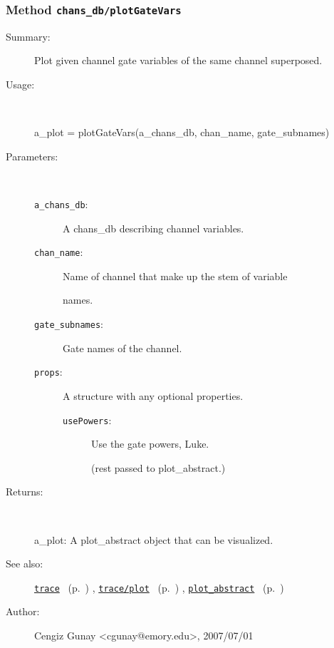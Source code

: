 \subsubsection[Method \texttt{plotGateVars}]{Method \texttt{chans\_db/plotGateVars}}%
%
\label{ref_chans_db__plotGateVars}%
\hypertarget{ref_chans_db__plotGateVars}{}%
\begin{description}
\item[Summary:]Plot given channel gate variables of the same channel superposed.
%
\item[Usage:]~%
\begin{lyxcode}%
a\_plot = plotGateVars(a\_chans\_db, chan\_name, gate\_subnames)
%
\end{lyxcode}%
%
%
\item[Parameters:]~
\begin{description}%
\item[\texttt{a\_chans\_db}:]
 A chans\_db describing channel variables.
\item[\texttt{chan\_name}:]
 Name of channel that make up the stem of variable

names.\item[\texttt{gate\_subnames}:]
 Gate names of the channel.
\item[\texttt{props}:]
 A structure with any optional properties.
\begin{description}%
\item[\texttt{usePowers}:]
 Use the gate powers, Luke.

(rest passed to plot\_abstract.)\end{description}%
\end{description}%
%
\item[Returns:]~

	a\_plot: A plot\_abstract object that can be visualized.
%
%
\item[See also:]%
\hyperlink{ref_trace}{\texttt{trace}}%
\ (p.~\pageref{ref_trace})%
%
, \hyperlink{ref_trace__plot}{\texttt{trace/plot}}%
\ (p.~\pageref{ref_trace__plot})%
%
, \hyperlink{ref_plot_abstract}{\texttt{plot\_abstract}}%
\ (p.~\pageref{ref_plot_abstract})%
%
%
\item[Author:]%
Cengiz Gunay <cgunay@emory.edu>, 2007/07/01%
\end{description}
\methodline%
